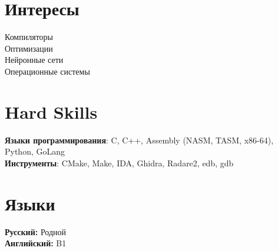 \documentclass[A4,11pt]{article}
\begin{document}

\section{Интересы}
 \begin{itemize}[leftmargin=0.5cm, label={}]
    \small{\item{
     {Компиляторы}\\
     {Оптимизации}\\
     {Нейронные сети}\\
     {Операционные системы}
    }}
 \end{itemize}

\section{Hard Skills}
 \begin{itemize}[leftmargin=0.5cm, label={}]
    \small{\item{
     \textbf{Языки программирования}{: C, C++, Assembly (NASM, TASM, x86-64), Python, GoLang} \\
     \textbf{Инструменты}{: CMake, Make, IDA, Ghidra, Radare2, edb, gdb}
    }}
 \end{itemize}

\section{Языки}
 \begin{itemize}[leftmargin=0.5cm, label={}]
    \small{\item{
\textbf{Русский:} Родной \\
\textbf{Английский:} B1
    }}
 \end{itemize}
\end{document}
